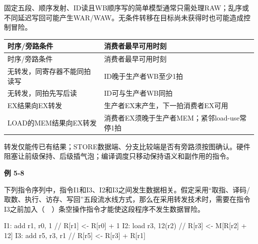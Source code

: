 固定五段、顺序发射、ID读且WB顺序写的简单模型通常只需处理RAW；乱序或不同延迟写回可能产生WAR/WAW。无条件转移在目标尚未获得时也可能造成控制冒险。

\par\smallskip
{\fontsize{9.3}{12}\selectfont\setlength{\tabcolsep}{2.5pt}\setlength{\LTleft}{0pt}\setlength{\LTright}{0pt}
\begin{longtable}{@{}>{\raggedright\arraybackslash}p{}>{\raggedright\arraybackslash}p{}@{}}
\toprule
时序/旁路条件 & 消费者最早可用时刻 \\

\midrule\endfirsthead\toprule
时序/旁路条件 & 消费者最早可用时刻 \\

\midrule\endhead\bottomrule\endfoot
无转发，同寄存器不能同拍读写 & ID晚于生产者WB至少1拍 \\

无转发，同拍先写后读 & ID可与生产者WB同拍 \\

EX结果向EX转发 & 生产者EX末产生，下一拍消费者EX可用 \\

LOAD的MEM结果向EX转发 & 消费者EX须晚于生产者MEM；紧邻load-use常停1拍 \\

\end{longtable}}
\par\smallskip

转发仅能传已有结果；STORE数据端、分支比较端是否有旁路须按图确认。硬件阻塞让前级保持、后级插气泡；编译调度只移动保持语义和副作用的指令。

\par\medskip{}\noindent\hypertarget{CO05-E08}{}\label{CO05-E08}\textbf{例 5-8}\par\nobreak\smallskip

下列指令序列中，指令I1和I3、I2和I3之间发生数据相关。假定采用``取指、译码/取数、执行、访存、写回''五段流水线方式，那么在采用转发技术时，需要在指令I3之前加入（　）条空操作指令才能使这段程序不发生数据冒险。

\par\smallskip\noindent\begin{minipage}{\linewidth}
\begin{codeblock}[language={}]
I1: add  r1, r0, 1    // R[r1] <- R[r0] + 1
I2: load r3, 12(r2)   // R[r3] <- M[R[r2] + 12]
I3: add  r5, r3, r1   // R[r5] <- R[r3] + R[r1]
\end{codeblock}
\end{minipage}\par\smallskip

